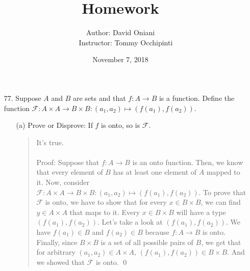 \documentclass[12pt, a4paper]{article}
\title{\bf{Homework \textnumero 11}}
\author{Author: David Oniani
\\
\ \ \ Instructor: Tommy Occhipinti}
\date{November 7, 2018}
\begin{document}
\maketitle

\begin{itemize}
\item[77.]
Suppose $A$ and $B$ are sets and that $f : A \rightarrow B$ is a function. Define the function
$\mathcal{F} : A \times A \rightarrow B \times B : (a_1, a_2) \mapsto (f(a_1), f(a_2))$.
\begin{itemize}
\item[(a)]
Prove or Disprove: If $f$ is onto, so is $\mathcal{F}$.
\begin{quote}
It's true.\\\\
Proof: Suppose that $f : A \rightarrow B$ is an onto function.
Then, we know that every element of $B$ has at least one element
of $A$ mapped to it. Now, consider $\mathcal{F} : A \times A \rightarrow B \times B : (a_1, a_2) \mapsto (f(a_1), f(a_2))$.
To prove that $\mathcal{F}$ is onto, we have to show that for every $x \in B \times B$, we can find $y \in A \times A$ that maps
to it. Every $x \in B \times B$ will have a type $(f(a_1), f(a_2))$. Let's take a look at $(f(a_1), f(a_2))$.
We have $f(a_1) \in B$ and $f(a_2) \in B$ because $f : A \rightarrow B$ is onto. Finally, since $B \times B$
is a set of all possible pairs of $B$, we get that for arbitrary $(a_1, a_2) \in A \times A$, $(f(a_1), f(a_2)) \in B \times B$.
And we showed that $\mathcal{F}$ is onto.
\qed
\end{quote}

\item[]


\end{itemize}
\end{itemize}
\end{document}
